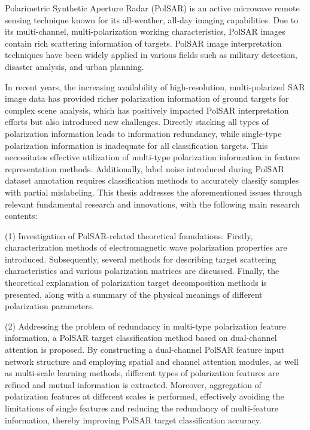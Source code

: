
\begin{englishabstract}
    Polarimetric Synthetic Aperture Radar (PolSAR) is an active microwave remote sensing technique known for its all-weather, all-day imaging capabilities. Due to its multi-channel, multi-polarization working characteristics, PolSAR images contain rich scattering information of targets. PolSAR image interpretation techniques have been widely applied in various fields such as military detection, disaster analysis, and urban planning.

    In recent years, the increasing availability of high-resolution, multi-polarized SAR image data has provided richer polarization information of ground targets for complex scene analysis, which has positively impacted PolSAR interpretation efforts but also introduced new challenges. Directly stacking all types of polarization information leads to information redundancy, while single-type polarization information is inadequate for all classification targets. This necessitates effective utilization of multi-type polarization information in feature representation methods. Additionally, label noise introduced during PolSAR dataset annotation requires classification methods to accurately classify samples with partial mislabeling. This thesis addresses the aforementioned issues through relevant fundamental research and innovations, with the following main research contents:

    (1) Investigation of PolSAR-related theoretical foundations. Firstly, characterization methods of electromagnetic wave polarization properties are introduced. Subsequently, several methods for describing target scattering characteristics and various polarization matrices are discussed. Finally, the theoretical explanation of polarization target decomposition methods is presented, along with a summary of the physical meanings of different polarization parameters.

    (2) Addressing the problem of redundancy in multi-type polarization feature information, a PolSAR target classification method based on dual-channel attention is proposed. By constructing a dual-channel PolSAR feature input network structure and employing spatial and channel attention modules, as well as multi-scale learning methods, different types of polarization features are refined and mutual information is extracted. Moreover, aggregation of polarization features at different scales is performed, effectively avoiding the limitations of single features and reducing the redundancy of multi-feature information, thereby improving PolSAR target classification accuracy.


\end{englishabstract}
